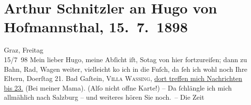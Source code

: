 

         
         \renewcommand{\erwaehntePersonen}{Personen: Richard Beer-Hofmann, Hugo von Hofmannsthal, Hugo August von Hofmannsthal, Anna von Hofmannsthal, Louise Schnitzler}
         \renewcommand{\erwaehnteOrte}{Orte: Bad Fusch, Bad Gastein, Graz, Salzburg, Tschortkiw, Villa Dr. Wassing, Wien}
         \renewcommand{\erwaehnteWerke}{Werke: Der Schleier der Beatrice. Schauspiel in fünf Akten, Der Sohn. Aus den Papieren eines Arztes, Therese. Chronik eines Frauenlebens}
               \section[Arthur Schnitzler an Hugo von Hofmannsthal, 15. 7. 1898]{ Arthur Schnitzler an Hugo von Hofmannsthal, 15. 7. 1898}\nopagebreak{}\rehead{ }\begin{ledgroupsized}[t]{13cm}\normalsize\beginnumbering \toendnotes[C]{\smallbreak\pagebreak[2]} 
\toendnotes[C]{\smallbreak}\pstart
           \raggedleft{}{\pb}Graz, Freitag{\\}15/7 98\pend
           \pstart
           Mein lieber Hugo, meine Abſicht iſt, So{\geminationn}tag von hier fortzureiſen; dann zu
                    Bahn, Rad, Wagen weiter, vielleicht ko{\geminationm} ich in die
                        Fuſch, da ſeh ich wohl noch Ihre Eltern, Do{\geminationn}erſtag 21.{ }\introOben{}Bad\introOben{} Gaſtein, \textsc{Villa
                            Wassing}, \uline{dort treffen mich Nachrichten bis
                            23.} (Bei meiner Mama). \introOben{}(Alſo nicht offne Karte!)\introOben{} – Da{\geminationn}{ }ſchlängle ich mich allmählich nach Salzburg – und weiteres hören Sie noch. – Die Zeit

\end{ledgroupsized}

